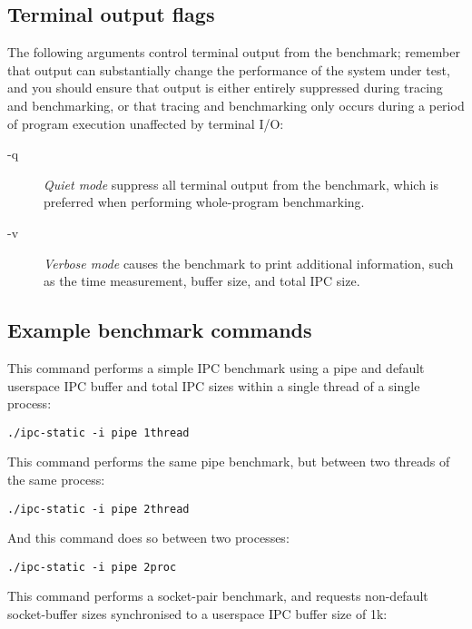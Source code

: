 \documentclass[a4paper,10pt]{article}
\begin{document}
\subsection*{Terminal output flags}

\noindent
The following arguments control terminal output from the benchmark; remember
that output can substantially change the performance of the system under test,
and you should ensure that output is either entirely suppressed during tracing
and benchmarking, or that tracing and benchmarking only occurs during a period
of program execution unaffected by terminal I/O:

\begin{description}
\item[-q] \textit{Quiet mode} suppress all terminal output from the benchmark,
  which is preferred when performing whole-program benchmarking.

\item[-v] \textit{Verbose mode} causes the benchmark to print additional
  information, such as the time measurement, buffer size, and total IPC size.
\end{description}

\subsection*{Example benchmark commands}

This command performs a simple IPC benchmark using a pipe and default
userspace IPC buffer and total IPC sizes within a single thread of a single
process:

\begin{verbatim}
./ipc-static -i pipe 1thread
\end{verbatim}

\noindent
This command performs the same pipe benchmark, but between two threads of the
same process:

\begin{verbatim}
./ipc-static -i pipe 2thread
\end{verbatim}

\noindent
And this command does so between two processes:

\begin{verbatim}
./ipc-static -i pipe 2proc
\end{verbatim}

\noindent
This command performs a socket-pair benchmark, and requests non-default
socket-buffer sizes synchronised to a userspace IPC buffer size of 1k:
\end{document}
